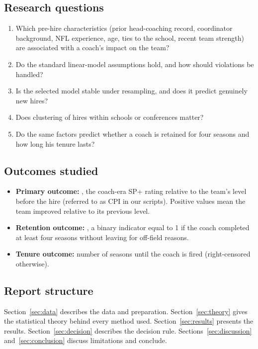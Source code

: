 \documentclass[11pt,a4paper]{article}
\newcommand{\var}[1]{\texttt{\detokenize{#1}}}
\begin{document}
\subsection{Research questions}
\begin{enumerate}[label=\textbf{Q\arabic*.}]
  \item Which pre-hire characteristics (prior head-coaching record, coordinator background, NFL experience, age, ties to the school, recent team strength) are associated with a coach's impact on the team?
  \item Do the standard linear-model assumptions hold, and how should violations be handled?
  \item Is the selected model stable under resampling, and does it predict genuinely new hires?
  \item Does clustering of hires within schools or conferences matter?
  \item Do the same factors predict whether a coach is retained for four seasons and how long his tenure lasts?
\end{enumerate}

\subsection{Outcomes studied}
\begin{itemize}
  \item \textbf{Primary outcome:} \var{sp_rel_team}, the coach-era SP+ rating relative to the team's level before the hire (referred to as CPI in our scripts). Positive values mean the team improved relative to its previous level.
  \item \textbf{Retention outcome:} \var{Retained4}, a binary indicator equal to 1 if the coach completed at least four seasons without leaving for off-field reasons.
  \item \textbf{Tenure outcome:} number of seasons until the coach is fired (right-censored otherwise).
\end{itemize}

\subsection{Report structure}
Section~\ref{sec:data} describes the data and preparation. Section~\ref{sec:theory} gives the statistical theory behind every method used. Section~\ref{sec:results} presents the results. Section~\ref{sec:decision} describes the decision rule. Sections~\ref{sec:discussion} and~\ref{sec:conclusion} discuss limitations and conclude.
\end{document}
